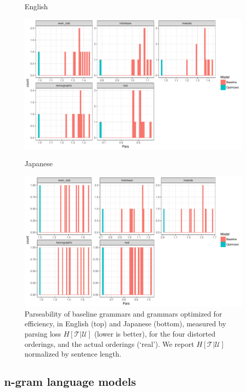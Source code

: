 \documentclass[10pt,twoside,lineno]{article}
\newcommand{\utterance}{\mathcal{U}}
\newcommand{\tree}{\mathcal{T}}
\begin{document}
\begin{figure}
    \centering
    English
    
    \includegraphics[scale=.5]{../results/permuted/adversarial-parse-loss-english.pdf}
    
    Japanese
    
    \includegraphics[scale=.5]{../results/permuted/adversarial-parse-loss-japanese.pdf}
	\caption{Parseability of baseline grammars and grammars optimized for efficiency, in English (top) and Japanese (bottom), measured by parsing loss $H[\tree|\utterance]$ (lower is better), for the four distorted orderings, and the actual orderings (`real'). We report $H[\tree|\utterance]$ normalized by sentence length.}
    \label{fig:distorted-parser}
\end{figure}


\subsection{n-gram language models}
\end{document}
